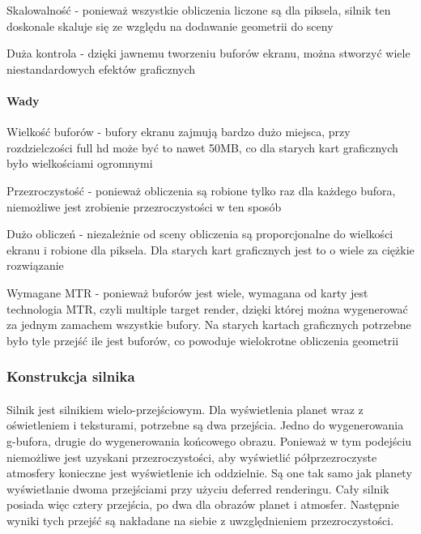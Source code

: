 \begin{description}
\item{Skalowalność} - ponieważ wszystkie obliczenia liczone są dla piksela, silnik ten doskonale skaluje się ze względu na dodawanie geometrii do sceny
\item{Duża kontrola} - dzięki jawnemu tworzeniu buforów ekranu, można stworzyć wiele niestandardowych efektów graficznych
\end{description}

\paragraph{Wady}

\begin{description}
\item{Wielkość buforów} - bufory ekranu zajmują bardzo dużo miejsca, przy rozdzielczości full hd może być to nawet 50MB, co dla starych kart graficznych było wielkościami ogromnymi
\item{Przezroczystość} - ponieważ obliczenia są robione tylko raz dla każdego bufora, niemożliwe jest zrobienie przezroczystości w ten sposób
\item{Dużo obliczeń} - niezależnie od sceny obliczenia są proporcjonalne do wielkości ekranu i robione dla piksela. Dla starych kart graficznych jest to o wiele za ciężkie rozwiązanie
\item{Wymagane MTR} - ponieważ buforów jest wiele, wymagana od karty jest technologia MTR, czyli multiple target render, dzięki której można wygenerować za jednym zamachem wszystkie bufory. Na starych kartach graficznych potrzebne było tyle przejść ile jest buforów, co powoduje wielokrotne obliczenia geometrii
\end{description}

\subsubsection{Konstrukcja silnika}\label{ssub:konstrukcja silnika}
\paragraph{}

Silnik jest silnikiem wielo-przejściowym. Dla wyświetlenia planet wraz z oświetleniem i teksturami, potrzebne są dwa przejścia. Jedno do wygenerowania g-bufora, drugie do wygenerowania końcowego obrazu. Ponieważ w tym podejściu niemożliwe jest uzyskani przezroczystości, aby wyświetlić półprzezroczyste atmosfery konieczne jest wyświetlenie ich oddzielnie. Są one tak samo jak planety wyświetlanie dwoma przejściami przy użyciu deferred renderingu. Cały silnik posiada więc cztery przejścia, po dwa dla obrazów planet i atmosfer. Następnie wyniki tych przejść są nakładane na siebie z uwzględnieniem przezroczystości.

